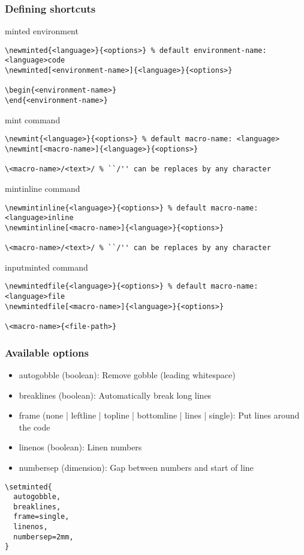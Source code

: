 \documentclass[../../latex]{subfiles}
\begin{document}
\subsubsection{Defining shortcuts}

minted environment

\begin{verbatim}
\newminted{<language>}{<options>} % default environment-name: <language>code
\newminted[<environment-name>]{<language>}{<options>}

\begin{<environment-name>}
\end{<environment-name>}
\end{verbatim}

mint command

\begin{verbatim}
\newmint{<language>}{<options>} % default macro-name: <language>
\newmint[<macro-name>]{<language>}{<options>}

\<macro-name>/<text>/ % ``/'' can be replaces by any character
\end{verbatim}

mintinline command

\begin{verbatim}
\newmintinline{<language>}{<options>} % default macro-name: <language>inline
\newmintinline[<macro-name>]{<language>}{<options>}

\<macro-name>/<text>/ % ``/'' can be replaces by any character
\end{verbatim}

inputminted command

\begin{verbatim}
\newmintedfile{<language>}{<options>} % default macro-name: <language>file
\newmintedfile[<macro-name>]{<language>}{<options>}

\<macro-name>{<file-path>}
\end{verbatim}

\subsubsection{Available options}

\begin{itemize}
  \item autogobble (boolean): Remove gobble (leading whitespace)
  \item breaklines (boolean): Automatically break long lines
  \item frame (none | leftline | topline | bottomline | lines | single): Put lines around the code
  \item linenos (boolean): Linen numbers
  \item numbersep (dimension): Gap between numbers and start of line
\end{itemize}

\begin{verbatim}
\setminted{
  autogobble,
  breaklines,
  frame=single,
  linenos,
  numbersep=2mm,
}
\end{verbatim}
\end{document}
